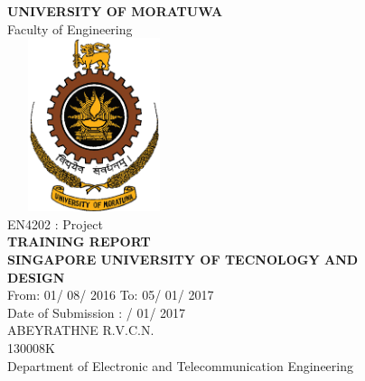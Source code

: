 \documentclass[12pt,a4paper,margin=1in]{article}
\begin{document}
\begin{titlepage}


\center %

\fontsize{16pt}{12}\selectfont \textbf{UNIVERSITY OF MORATUWA}\\[0.5cm] %
\fontsize{16pt}{12}\selectfont Faculty of Engineering\\[0.5cm] %

\includegraphics[width=2in,height=2in,keepaspectratio]{logo.png}\\[1cm] %


\fontsize{16pt}{12}\selectfont EN4202 : Project\\[0.5cm]
\fontsize{16pt}{12}\selectfont \textbf{TRAINING REPORT}\\[1.5cm]
\fontsize{16pt}{12}\selectfont \textbf{SINGAPORE UNIVERSITY OF TECNOLOGY AND}\\[4pt] 
\fontsize{16pt}{12}\selectfont \textbf{DESIGN}\\[0.5cm]
\fontsize{16pt}{12}\selectfont From: 01/ 08/ 2016 To: 05/ 01/ 2017\\[2cm]

\fontsize{16pt}{12}\selectfont Date of Submission : {\fontsize{16pt}{12}/ 01/ 2017}\\[1cm]

\fontsize{16pt}{12}\selectfont ABEYRATHNE R.V.C.N.\\[0.5cm]
\fontsize{16pt}{12}\selectfont 130008K\\[1cm]

\fontsize{16pt}{12}\selectfont Department of Electronic and Telecommunication Engineering\\[1cm]


\vfill %

\end{titlepage}
\end{document}
